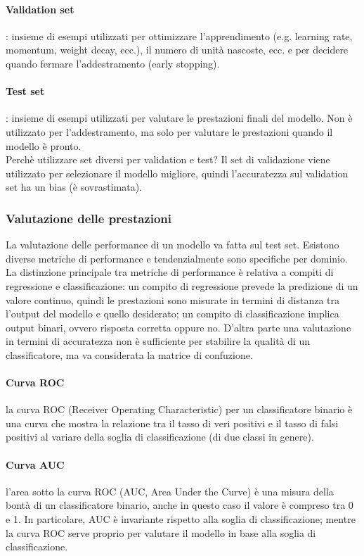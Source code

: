 \paragraph{Validation set}: insieme di esempi utilizzati per ottimizzare
l'apprendimento (e.g. learning rate, momentum, weight decay, ecc.), il numero di
unità nascoste, ecc. e per decidere quando fermare l'addestramento (early
stopping).

\paragraph{Test set}: insieme di esempi utilizzati per valutare le prestazioni
finali del modello. Non è utilizzato per l'addestramento, ma solo per valutare 
le prestazioni quando il modello è pronto.\\

Perchè utilizzare set diversi per validation e test? Il set di validazione viene
utilizzato per selezionare il modello migliore, quindi l'accuratezza sul
validation set ha un bias (è sovrastimata).

\subsubsection{Valutazione delle prestazioni}

La valutazione delle performance di un modello va fatta sul test set. Esistono
diverse metriche di performance e tendenzialmente sono specifiche per dominio.
La distinzione principale tra metriche di performance è relativa a compiti di
regressione e classificazione: un compito di regressione prevede la predizione
di un valore continuo, quindi le prestazioni sono misurate in termini di
distanza tra l'output del modello e quello desiderato; un compito di
classificazione implica output binari, ovvero risposta corretta oppure no.
D'altra parte una valutazione in termini di accuratezza non è sufficiente per
stabilire la qualità di un classificatore, ma va considerata la matrice di
confuzione.

\paragraph{Curva ROC} la curva ROC (Receiver Operating Characteristic) per un
classificatore binario è una curva che mostra la relazione tra il tasso di
veri positivi e il tasso di falsi positivi al variare della soglia di
classificazione (di due classi in genere).

\paragraph{Curva AUC} l'area sotto la curva ROC (AUC, Area Under the Curve) è
una misura della bontà di un classificatore binario, anche in questo caso il
valore è compreso tra 0 e 1. In particolare, AUC è invariante rispetto alla
soglia di classificazione; mentre la curva ROC serve proprio per valutare il
modello in base alla soglia di classificazione.
